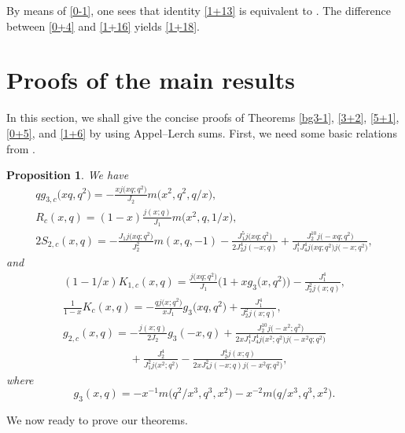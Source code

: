 \documentclass[pdftex]{sigma}
\numberwithin{equation}{section}
\newtheorem{Proposition}[Theorem]{Proposition}
 { \theoremstyle{definition}
\newtheorem{Definition}[Theorem]{Definition}
\newtheorem{Note}[Theorem]{Note}
\newtheorem{Example}[Theorem]{Example}
\newtheorem{Remark}[Theorem]{Remark} }
\begin{document}
\begin{Remark}
By means of \eqref{0-1}, one sees that identity \eqref{1+13} is equivalent to \cite[equation~(16)]{Hi}.
The difference between \eqref{0+4} and \eqref{1+16} yields \eqref{1+18}.
\end{Remark}

\section{Proofs of the main results} \label{sec1}
In this section, we shall give the concise proofs of Theorems \ref{bg3-1}, \ref{3+2}, \ref{5+1}, \ref{0+5}, and \ref{1+6} by using Appel--Lerch sums. First, we need some basic relations from \cite[equations~(4.1), (3.1), (5.12), (5.5), (5.18), (6.10)]{Mo}.
\begin{Proposition} We have
\begin{gather}
\label{2-5}
qg_{3,c}\bigl(xq,q^2\bigr)=-\frac{xj\bigl(xq;q^2\bigr)}{J_2}m\bigl(x^2,q^2,q/x\bigr),\\
R_c(x,q)=(1-x)\frac{j(x;q)}{J_1}m\bigl(x^2,q,1/x\bigr),\label{2.2-add}\\
2S_{2,c}(x,q)=-\frac{J_1j\bigl(xq;q^2\bigr)}{J_2^2}m(x,q,-1)
-\frac{J_1^5j\bigl(xq;q^2\bigr)}{2J_2^4j(-x;q)}+\frac{J_2^{10}j\bigl(-xq;q^2\bigr)}{J_1^4J_4^4j \bigl(xq;q^2\bigr)j\bigl(-x;q^2\bigr)}, \label{3-3}
\end{gather}
and
\begin{gather}\label{2-7}
(1-1/x)K_{1,c}(x,q)=\frac{j\bigl(xq;q^2\bigr)}{J_1}\bigl(1+xg_3\bigl(x,q^2\bigr)\bigr)
-\frac{J_1^4}{J_2^2j(x;q)},\\
\frac{1}{1-x}K_{c}(x,q)=-\frac{qj\bigl(x;q^2\bigr)}{xJ_1}g_3\bigl(xq,q^2\bigr)
+\frac{J_1^4}{J_2^2j(x;q)},\label{2-4}\\
g_{2,c}(x,q)=-\frac{j(x;q)}{2J_2}g_3(-x,q)
+\frac{J_2^{10}j\bigl(-x^2;q^2\bigr)}{2xJ_1^4J_4^4j\bigl(x^2;q^2\bigr)j\bigl(-x^2q;q^2\bigr)}\nonumber\\
\phantom{g_{2,c}(x,q)=}{}+\frac{J_2^4}{J_1^2j\bigl(x^2;q^2\bigr)}
-\frac{J_2^4j(x;q)}{2xJ_4^2j(-x;q)j\bigl(-x^2q;q^2\bigr)},\label{2-8}
\end{gather}
where
 \[g_3(x,q)=-x^{-1}m\bigl(q^2/x^3,q^3,x^2\bigr)-x^{-2}m\bigl(q/x^3,q^3,x^2\bigr).\]
\end{Proposition}

We now ready to prove our theorems.
\end{document}
